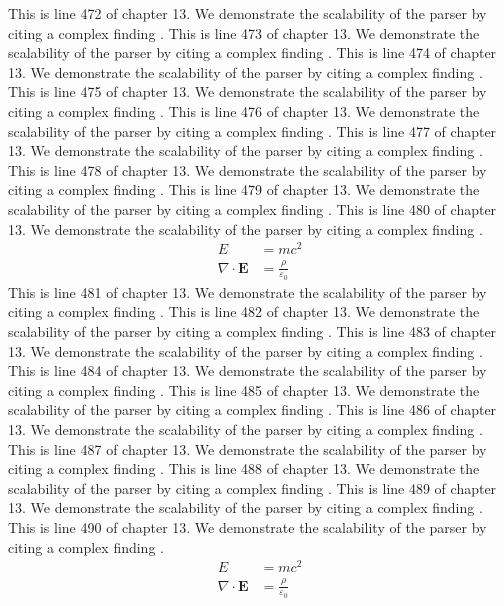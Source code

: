 This is line 472 of chapter 13. We demonstrate the scalability of the parser by citing a complex finding \cite{ref13_472}.
This is line 473 of chapter 13. We demonstrate the scalability of the parser by citing a complex finding \cite{ref13_473}.
This is line 474 of chapter 13. We demonstrate the scalability of the parser by citing a complex finding \cite{ref13_474}.
This is line 475 of chapter 13. We demonstrate the scalability of the parser by citing a complex finding \cite{ref13_475}.
This is line 476 of chapter 13. We demonstrate the scalability of the parser by citing a complex finding \cite{ref13_476}.
This is line 477 of chapter 13. We demonstrate the scalability of the parser by citing a complex finding \cite{ref13_477}.
This is line 478 of chapter 13. We demonstrate the scalability of the parser by citing a complex finding \cite{ref13_478}.
This is line 479 of chapter 13. We demonstrate the scalability of the parser by citing a complex finding \cite{ref13_479}.
This is line 480 of chapter 13. We demonstrate the scalability of the parser by citing a complex finding \cite{ref13_480}.
\begin{align*}
  E &= mc^2 \\
  \nabla \cdot \mathbf{E} &= \frac{\rho}{\varepsilon_0}
\end{align*}
This is line 481 of chapter 13. We demonstrate the scalability of the parser by citing a complex finding \cite{ref13_481}.
This is line 482 of chapter 13. We demonstrate the scalability of the parser by citing a complex finding \cite{ref13_482}.
This is line 483 of chapter 13. We demonstrate the scalability of the parser by citing a complex finding \cite{ref13_483}.
This is line 484 of chapter 13. We demonstrate the scalability of the parser by citing a complex finding \cite{ref13_484}.
This is line 485 of chapter 13. We demonstrate the scalability of the parser by citing a complex finding \cite{ref13_485}.
This is line 486 of chapter 13. We demonstrate the scalability of the parser by citing a complex finding \cite{ref13_486}.
This is line 487 of chapter 13. We demonstrate the scalability of the parser by citing a complex finding \cite{ref13_487}.
This is line 488 of chapter 13. We demonstrate the scalability of the parser by citing a complex finding \cite{ref13_488}.
This is line 489 of chapter 13. We demonstrate the scalability of the parser by citing a complex finding \cite{ref13_489}.
This is line 490 of chapter 13. We demonstrate the scalability of the parser by citing a complex finding \cite{ref13_490}.
\begin{align*}
  E &= mc^2 \\
  \nabla \cdot \mathbf{E} &= \frac{\rho}{\varepsilon_0}
\end{align*}
